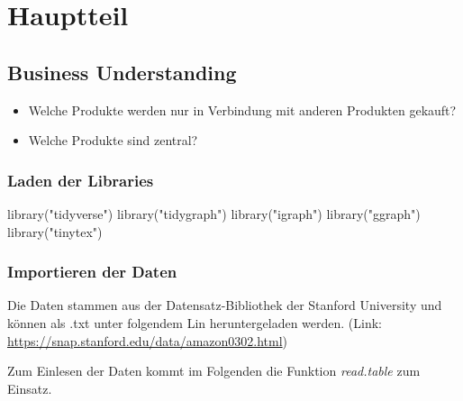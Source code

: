 \documentclass[
  12 pt,
]{article}
\newenvironment{Shaded}{\begin{snugshade}}{\end{snugshade}}
\newcommand{\FunctionTok}[1]{\textcolor[rgb]{0.00,0.00,0.00}{#1}}
\newcommand{\NormalTok}[1]{#1}
\newcommand{\StringTok}[1]{\textcolor[rgb]{0.31,0.60,0.02}{#1}}
\providecommand{\tightlist}{%
  \setlength{\itemsep}{0pt}\setlength{\parskip}{0pt}}
\begin{document}
\newpage

\hypertarget{hauptteil}{%
\section{Hauptteil}\label{hauptteil}}

\hypertarget{business-understanding}{%
\subsection{Business Understanding}\label{business-understanding}}

\begin{itemize}
\tightlist
\item
  Welche Produkte werden nur in Verbindung mit anderen Produkten
  gekauft?
\item
  Welche Produkte sind zentral?
\end{itemize}

\hypertarget{laden-der-libraries}{%
\subsubsection{Laden der Libraries}\label{laden-der-libraries}}

\begin{Shaded}
\begin{Highlighting}[]
\FunctionTok{library}\NormalTok{(}\StringTok{"tidyverse"}\NormalTok{)}
\FunctionTok{library}\NormalTok{(}\StringTok{"tidygraph"}\NormalTok{)}
\FunctionTok{library}\NormalTok{(}\StringTok{"igraph"}\NormalTok{)}
\FunctionTok{library}\NormalTok{(}\StringTok{"ggraph"}\NormalTok{)}
\FunctionTok{library}\NormalTok{(}\StringTok{"tinytex"}\NormalTok{)}
\end{Highlighting}
\end{Shaded}

\hypertarget{importieren-der-daten}{%
\subsubsection{Importieren der Daten}\label{importieren-der-daten}}

Die Daten stammen aus der Datensatz-Bibliothek der Stanford University
und können als .txt unter folgendem Lin heruntergeladen werden. (Link:
\url{https://snap.stanford.edu/data/amazon0302.html})

Zum Einlesen der Daten kommt im Folgenden die Funktion
\textit{read.table} zum Einsatz.\\
\end{document}
